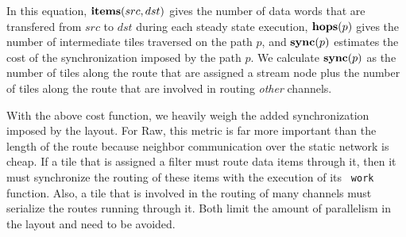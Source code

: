 In this equation, ${\bf items}(src, dst)$ gives the number of data
words that are transfered from $src$ to $dst$ during each steady state
execution, ${\bf hops}(p)$ gives the number of intermediate tiles
traversed on the path $p$, and ${\bf sync}(p)$ estimates the cost of
the synchronization imposed by the path $p$.  We calculate ${\bf
sync}(p)$ as the number of tiles along the route that are assigned a
stream node plus the number of tiles along the route that are involved
in routing {\it other} channels.

With the above cost function, we heavily weigh the added
synchronization imposed by the layout.  For Raw, this metric is far
more important than the length of the route because neighbor
communication over the static network is cheap.  If a tile that is
assigned a filter must route data items through it, then it must
synchronize the routing of these items with the execution of its {\tt
work} function.  Also, a tile that is involved in the routing of many
channels must serialize the routes running through it.  Both limit the
amount of parallelism in the layout and need to be avoided.


